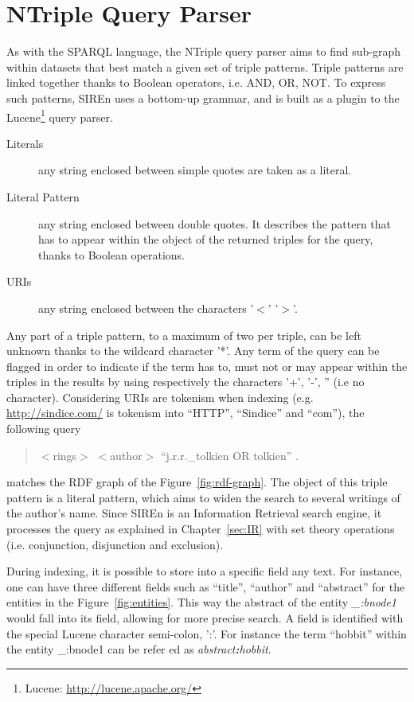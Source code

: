 \section{NTriple Query Parser}
\label{sec:N3-qparser}

As with the SPARQL language, the NTriple query parser aims to find sub-graph
within datasets that best match a given set of triple patterns. Triple patterns
are linked together thanks to Boolean operators, i.e. AND, OR, NOT. To express
such patterns, SIREn uses a bottom-up grammar, and is built as a plugin to the
Lucene\footnote{Lucene: \url{http://lucene.apache.org/}} query parser.
\begin{description}
  \item[Literals] any string enclosed between simple quotes are taken as a
  literal.
  \item[Literal Pattern] any string enclosed between double quotes. It
  describes the pattern that has to appear within the object of the returned
  triples for the query, thanks to Boolean operations.
  \item[URIs] any string enclosed between the characters '$<$' \whs '$>$'.
\end{description}
Any part of a triple pattern, to a maximum of two per triple, can be left
unknown thanks to the wildcard character '*'. Any term of the query can be
flagged in order to indicate if the term has to, must not or may appear within
the triples in the results by using respectively the characters '+', '-', ''
(i.e no character). Considering URIs are tokenism when indexing (e.g.
\url{http://sindice.com/} is tokenism into ``HTTP'', ``Sindice'' and ``com''),
the following query
\begin{quotation}
$<$rings$>$ $<$author$>$ ``j.r.r.\_tolkien OR tolkien'' .
\end{quotation}
matches the RDF graph of the Figure~\ref{fig:rdf-graph}. The object of this
triple pattern is a literal pattern, which aims to widen the search to several
writings of the author's name. Since SIREn is an Information Retrieval search
engine, it processes the query as explained in Chapter~\ref{sec:IR} with set
theory operations (i.e. conjunction, disjunction and exclusion).

During indexing, it is possible to store into a specific field any text. For
instance, one can have three different fields such as ``title'', ``author'' and
``abstract'' for the entities in the Figure~\ref{fig:entities}. This way the
abstract of the entity \emph{\_:bnode1} would fall into its field, allowing for
more precise search. A field is identified with the special Lucene character
semi-colon, ':'. For instance the term ``hobbit'' within the entity \_:bnode1
can be refer ed as \emph{abstract{\bfseries :}hobbit}. 

